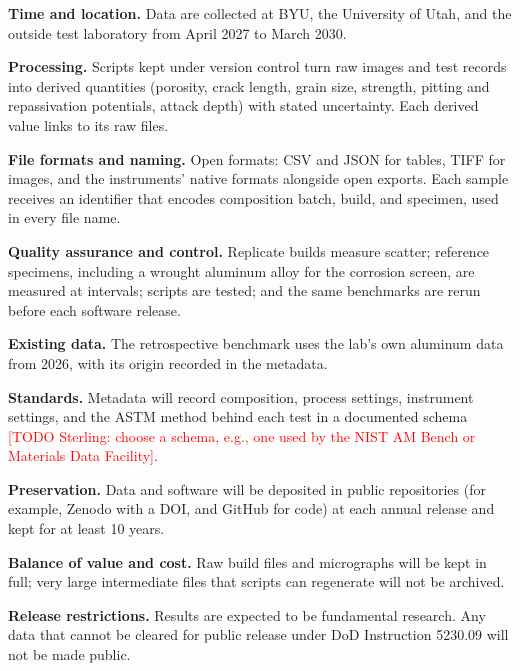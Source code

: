 \documentclass[12pt,letterpaper]{article}
\newcommand{\todo}[1]{\textcolor{red}{[TODO Sterling: #1]}}
\begin{document}
\textbf{Time and location.} Data are collected at BYU, the University of
Utah, and the outside test laboratory from April 2027 to March 2030.

\textbf{Processing.} Scripts kept under version control turn raw images and
test records into derived quantities (porosity, crack length, grain size,
strength, pitting and repassivation potentials, attack depth) with stated
uncertainty. Each derived value links to its raw files.

\textbf{File formats and naming.} Open formats: CSV and JSON for tables, TIFF
for images, and the instruments' native formats alongside open exports.
Each sample receives an identifier that encodes composition batch, build, and
specimen, used in every file name.

\textbf{Quality assurance and control.} Replicate builds measure scatter;
reference specimens, including a wrought aluminum alloy for the corrosion
screen, are measured at intervals; scripts are tested; and the same
benchmarks are rerun before each software release.

\textbf{Existing data.} The retrospective benchmark uses the lab's own
aluminum data from 2026, with its origin recorded in the metadata.

\textbf{Standards.} Metadata will record composition, process settings,
instrument settings, and the ASTM method behind each test in a documented
schema \todo{choose a schema, e.g., one used by the NIST AM Bench or
Materials Data Facility}.

\textbf{Preservation.} Data and software will be deposited in public
repositories (for example, Zenodo with a DOI, and GitHub for code) at each
annual release and kept for at least 10 years.

\textbf{Balance of value and cost.} Raw build files and micrographs will be
kept in full; very large intermediate files that scripts can regenerate will
not be archived.

\textbf{Release restrictions.} Results are expected to be fundamental
research. Any data that cannot be cleared for public release under DoD
Instruction 5230.09 will not be made public.

\clearpage
\setcounter{page}{1}
\renewcommand{\thepage}{S-\arabic{page}}
\end{document}

